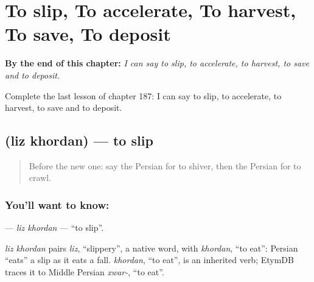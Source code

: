 
\chapter{To slip, To accelerate, To harvest, To save, To deposit}
\label{ch:fa-to-slip-to-accelerate-to-harvest-to-save-to-deposit}

\begin{chapteropening}
\textbf{By the end of this chapter:} \emph{I can say to slip, to accelerate, to harvest, to save and to deposit.}

Complete the last lesson of chapter 187: I can say to slip, to accelerate, to harvest, to save and to deposit.
\end{chapteropening}

\section[\texorpdfstring{\fa{لیز} \fa{خوردن} (liz khordan)}{لیز خوردن (liz khordan)}]{  (liz khordan) — to slip}

\label{lesson:FA-C187-liz-khordan}



\begin{quote}
Before the new one: say the Persian for to shiver, then the Persian for to crawl.
\end{quote}

\subsection*{You'll want to know:  }
\textbf{ } — \emph{liz khordan} — \textquotedblleft{}to slip\textquotedblright{}.

\begin{cousinweb}
\emph{liz khordan} pairs \emph{liz}, \textquotedblleft{}slippery\textquotedblright{}, a native word, with \emph{khordan}, \textquotedblleft{}to eat\textquotedblright{}: Persian \textquotedblleft{}eats\textquotedblright{} a slip as it eats a fall. \emph{khordan}, \textquotedblleft{}to eat\textquotedblright{}, is an inherited verb; EtymDB traces it to Middle Persian \emph{xwar-}, \textquotedblleft{}to eat\textquotedblright{}.
\end{cousinweb}


